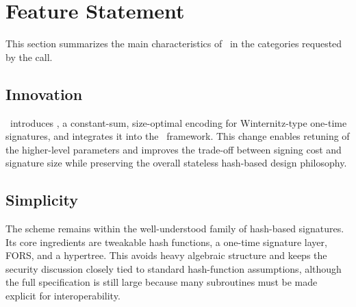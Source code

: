 \newpage
\begin{table}[tp]
    \centering
    \caption{Performance comparison between the original and improved \SPHINCSP in terms of relative changes.}
    \label{tab:bench comp}
\end{table}

\section{Feature Statement}
\label{sec:feature-statement}

This section summarizes the main characteristics of \SPHINCSA\ in the categories requested by the call.

\subsection{Innovation}

\SPHINCSA\ introduces \WOTSCS, a constant-sum, size-optimal encoding for Winternitz-type one-time signatures, and integrates it into the \SPHINCSP\ framework. This change enables retuning of the higher-level parameters and improves the trade-off between signing cost and signature size while preserving the overall stateless hash-based design philosophy.

\subsection{Simplicity}

The scheme remains within the well-understood family of hash-based signatures. Its core ingredients are tweakable hash functions, a one-time signature layer, FORS, and a hypertree. This avoids heavy algebraic structure and keeps the security discussion closely tied to standard hash-function assumptions, although the full specification is still large because many subroutines must be made explicit for interoperability.

